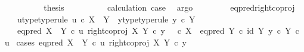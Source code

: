 \begin{isabellebody}
\ \ \ \ \ \ \isamarkupfalse%
\ \isamarkupfalse%
\ {\isacharquery}{\kern0pt}thesis\isanewline
\ \ \ \ \ \ \ \ \isamarkupfalse%
\ calculation\ case{}\ \isamarkupfalse%
\ argo\isanewline
\ \ \ \ \isamarkupfalse%
\isanewline
\ \ \isamarkupfalse%
\isanewline
{}\isamarkupfalse%
%
\endisatagproof
{\isafoldproof}%
%
\isadelimproof
\isanewline
%
\endisadelimproof
\isanewline
{}\isamarkupfalse%
\ eq{\isacharunderscore}{\kern0pt}pred{\isacharunderscore}{\kern0pt}right{\isacharunderscore}{\kern0pt}coproj{\isacharcolon}{\kern0pt}\isanewline
\ \ \ u{\isacharunderscore}{\kern0pt}type{\isacharbrackleft}{\kern0pt}type{\isacharunderscore}{\kern0pt}rule{\isacharbrackright}{\kern0pt}{\isacharcolon}{\kern0pt}\ {\isachardoublequoteopen}u\ {\isasymin}\isactrlsub c\ X\ {\isasymCoprod}\ Y{\isachardoublequoteclose}\ \ y{\isacharunderscore}{\kern0pt}type{\isacharbrackleft}{\kern0pt}type{\isacharunderscore}{\kern0pt}rule{\isacharbrackright}{\kern0pt}{\isacharcolon}{\kern0pt}\ {\isachardoublequoteopen}y\ {\isasymin}\isactrlsub c\ Y{\isachardoublequoteclose}\isanewline
\ \ \ {\isachardoublequoteopen}eq{\isacharunderscore}{\kern0pt}pred\ {\isacharparenleft}{\kern0pt}X\ {\isasymCoprod}\ Y{\isacharparenright}{\kern0pt}\ {\isasymcirc}\isactrlsub c\ {\isasymlangle}u{\isacharcomma}{\kern0pt}\ right{\isacharunderscore}{\kern0pt}coproj\ X\ Y\ {\isasymcirc}\isactrlsub c\ y{\isasymrangle}\ {\isacharequal}{\kern0pt}\ {\isacharparenleft}{\kern0pt}{\isacharparenleft}{\kern0pt}{\isasymf}\ {\isasymcirc}\isactrlsub c\ {\isasymbeta}\isactrlbsub X\isactrlesub {\isacharparenright}{\kern0pt}\ {\isasymamalg}\ {\isacharparenleft}{\kern0pt}eq{\isacharunderscore}{\kern0pt}pred\ Y\ {\isasymcirc}\isactrlsub c\ {\isasymlangle}id\ Y{\isacharcomma}{\kern0pt}\ y\ {\isasymcirc}\isactrlsub c\ {\isasymbeta}\isactrlbsub Y\isactrlesub {\isasymrangle}{\isacharparenright}{\kern0pt}{\isacharparenright}{\kern0pt}\ {\isasymcirc}\isactrlsub c\ u{\isachardoublequoteclose}\isanewline
%
\isadelimproof
%
\endisadelimproof
%
\isatagproof
{}\isamarkupfalse%
\ {\isacharparenleft}{\kern0pt}cases\ {\isachardoublequoteopen}eq{\isacharunderscore}{\kern0pt}pred\ {\isacharparenleft}{\kern0pt}X\ {\isasymCoprod}\ Y{\isacharparenright}{\kern0pt}\ {\isasymcirc}\isactrlsub c\ {\isasymlangle}u{\isacharcomma}{\kern0pt}\ right{\isacharunderscore}{\kern0pt}coproj\ X\ Y\ {\isasymcirc}\isactrlsub c\ y{\isasymrangle}\ {\isacharequal}{\kern0pt}\ {\isasymt}{\isachardoublequoteclose}{\isacharparenright}{\kern0pt}\isanewline

\end{isabellebody}
